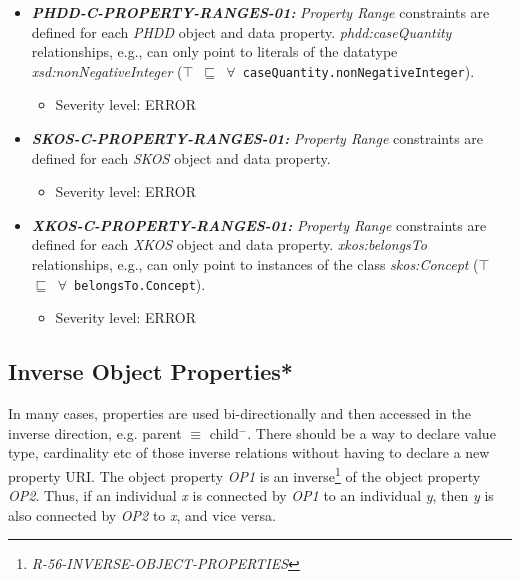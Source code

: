 \documentclass{llncs}
\newcommand{\ms}[1]{\texttt{#1}}
\begin{document}
\begin{itemize}
	\item \textbf{{\em PHDD-C-PROPERTY-RANGES-01:}} 
	{\em Property Range} constraints are defined for each \emph{PHDD} object and data property.
  {\em phdd:caseQuantity} relationships, e.g., can only point to literals of the datatype {\em xsd:nonNegativeInteger} (\ms{$\top$ $\sqsubseteq$ $\forall$ caseQuantity.nonNegativeInteger}).
	\begin{itemize}
		\item Severity level: ERROR
	\end{itemize}
\end{itemize}

\begin{itemize}
	\item \textbf{{\em SKOS-C-PROPERTY-RANGES-01:}} 
	{\em Property Range} constraints are defined for each \emph{SKOS} object and data property.
	\begin{itemize}
		\item Severity level: ERROR
	\end{itemize}
\end{itemize}

\begin{itemize}
	\item \textbf{{\em XKOS-C-PROPERTY-RANGES-01:}} 
	{\em Property Range} constraints are defined for each \emph{XKOS} object and data property.
  {\em xkos:belongsTo} relationships, e.g., can only point to instances of the class {\em skos:Concept} (\ms{$\top$ $\sqsubseteq$ $\forall$ belongsTo.Concept}).
	\begin{itemize}
		\item Severity level: ERROR
	\end{itemize}
\end{itemize}

\subsection{Inverse Object Properties*}

In many cases, properties are used bi-directionally and then accessed in the inverse direction, e.g. parent $\equiv$ child$^{-}$. There should be a way to declare value type, cardinality etc of those inverse relations without having to declare a new property URI. 
The object property \emph{OP1} is an inverse\footnote{\emph{R-56-INVERSE-OBJECT-PROPERTIES}} of the object property \emph{OP2}. 
Thus, if an individual \emph{x} is connected by \emph{OP1} to an individual \emph{y}, then \emph{y} is also connected by \emph{OP2} to \emph{x}, and vice versa.
\end{document}
